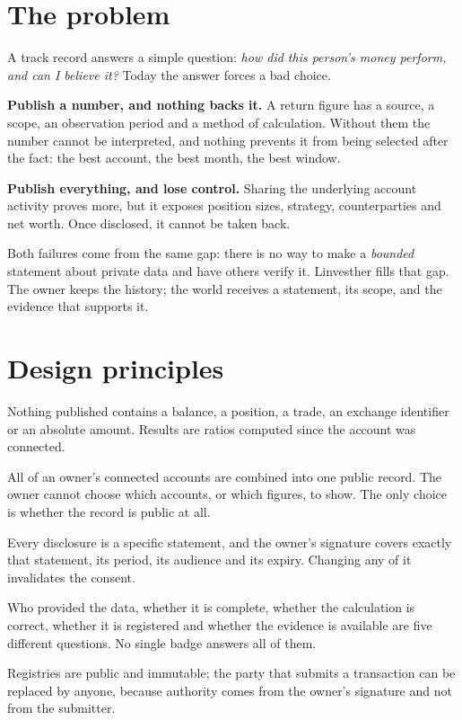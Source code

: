 \documentclass[11pt,a4paper]{article}
\begin{document}
\vspace{1.2em}
{\small\tableofcontents}
\newpage
{}

\section{The problem}
A track record answers a simple question: \emph{how did this person's money perform, and can I believe it?} Today the answer forces a bad choice.

\textbf{Publish a number, and nothing backs it.} A return figure has a source, a scope, an observation period and a method of calculation. Without them the number cannot be interpreted, and nothing prevents it from being selected after the fact: the best account, the best month, the best window.

\textbf{Publish everything, and lose control.} Sharing the underlying account activity proves more, but it exposes position sizes, strategy, counterparties and net worth. Once disclosed, it cannot be taken back.

Both failures come from the same gap: there is no way to make a \emph{bounded} statement about private data and have others verify it. Linvesther fills that gap. The owner keeps the history; the world receives a statement, its scope, and the evidence that supports it.

\section{Design principles}
\begin{description}[leftmargin=1.2em,style=nextline,itemsep=0.4em]
\item[Percentages, never amounts.] Nothing published contains a balance, a position, a trade, an exchange identifier or an absolute amount. Results are ratios computed since the account was connected.
\item[No cherry-picking.] All of an owner's connected accounts are combined into one public record. The owner cannot choose which accounts, or which figures, to show. The only choice is whether the record is public at all.
\item[Consent is exact.] Every disclosure is a specific statement, and the owner's signature covers exactly that statement, its period, its audience and its expiry. Changing any of it invalidates the consent.
\item[Guarantees are separate.] Who provided the data, whether it is complete, whether the calculation is correct, whether it is registered and whether the evidence is available are five different questions. No single badge answers all of them.
\item[No dependence on a vendor.] Registries are public and immutable; the party that submits a transaction can be replaced by anyone, because authority comes from the owner's signature and not from the submitter.
\end{description}
\end{document}

